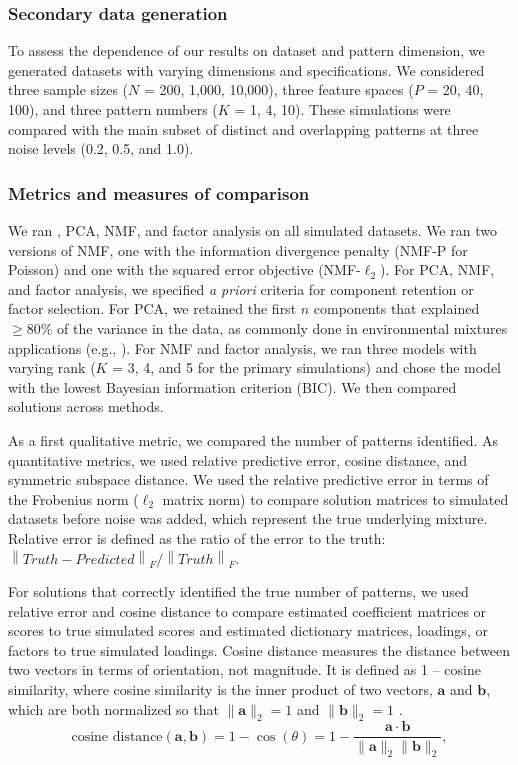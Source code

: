 \subsubsection{Secondary data generation} 
To assess the dependence of our results on dataset and pattern dimension, we generated datasets with varying dimensions and specifications. We considered three sample sizes ($N$ = 200, 1,000, 10,000), three feature spaces ($P$ = 20, 40, 100), and three pattern numbers ($K$ = 1, 4, 10). These simulations were compared with the main subset of distinct and overlapping patterns at three noise levels (0.2, 0.5, and 1.0).

\subsubsection{Metrics and measures of comparison}
\label{methods_metrics}
We ran \bnmfc, PCA, NMF, and factor analysis on all simulated datasets. We ran two versions of NMF, one with the information divergence penalty (NMF-P for Poisson) and one with the squared error objective (NMF-$\ell_2$). For PCA, NMF, and factor analysis, we specified \textit{a priori} criteria for component retention or factor selection. For PCA, we retained the first $n$ components that explained $\geq 80\%$ of the variance in the data, as commonly done in environmental mixtures applications (e.g., \cite{gibson2019overview}). For NMF and factor analysis, we ran three models with varying rank ($K$ = 3, 4, and 5 for the primary simulations) and chose the model with the lowest Bayesian information criterion (BIC). We then compared solutions across methods. 

As a first qualitative metric, we compared the number of patterns identified. As quantitative metrics, we used relative predictive error, cosine distance, and symmetric subspace distance. We used the relative predictive error in terms of the Frobenius norm ($\ell_2$ matrix norm) to compare solution matrices to simulated datasets before noise was added, which represent the true underlying mixture. Relative error is defined as the ratio of the error to the truth: $\left\lVert Truth - Predicted\right\rVert_F / \left\lVert  Truth\right\rVert_F$. 

For solutions that correctly identified the true number of patterns, we used relative error and cosine distance to compare estimated coefficient matrices or scores to true simulated scores and estimated dictionary matrices, loadings, or factors to true simulated loadings. Cosine distance measures the distance between two vectors in terms of orientation, not magnitude. It is defined as 1 -- cosine similarity, where cosine similarity is the inner product of two vectors, $\mathbf{a}$ and $\mathbf{b}$, which are both normalized so that $\|\mathbf{a}\|_2 = 1$ and $\|\mathbf{b}\|_2 = 1$ \cite{tan2016introduction}. 
\begin{equation}
\text{cosine distance}(\mathbf{a}, \mathbf{b}) = 1 - \cos (\theta)=1 - \frac{\mathbf{a} \cdot \mathbf{b}}{\|\mathbf{a}\|_2\|\mathbf{b}\|_2},
\end{equation}

